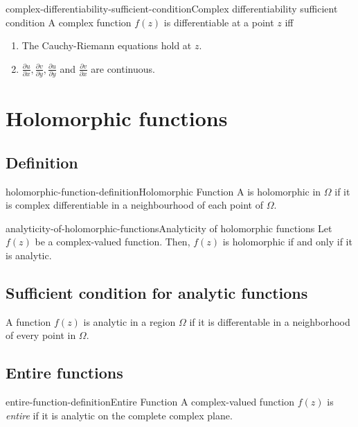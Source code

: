 \documentclass[preview]{standalone}
\begin{document}
\begin{snippettheorem}{complex-differentiability-sufficient-condition}{Complex differentiability sufficient condition}
    A complex function \(f(z)\) is differentiable at a point \(z\)
    iff
    \begin{enumerate}
        \item The Cauchy-Riemann equations hold at \(z\).
        \item \(\frac{\partial u}{\partial x}, \frac{\partial v}{\partial y},
        \frac{\partial u}{\partial y}\) and \(\frac{\partial v}{\partial x}\)
        are continuous.
    \end{enumerate}
\end{snippettheorem}

\section{Holomorphic functions}

\subsection{Definition}

\begin{snippetdefinition}{holomorphic-function-definition}{Holomorphic Function}
    A \function is holomorphic in \(\Omega\) if it is complex differentiable
    in a neighbourhood of each point of \(\Omega\).
\end{snippetdefinition}

\begin{snippettheorem}{analyticity-of-holomorphic-functions}{Analyticity of holomorphic functions}
    Let \(f(z)\) be a complex-valued function.
    Then, \(f(z)\) is holomorphic if and only if it is analytic.
\end{snippettheorem}


\subsection{Sufficient condition for analytic functions}

A function \(f(z)\) is analytic in a region \(\Omega\) if it is differentable
in a neighborhood of every point in \(\Omega\).

\subsection{Entire functions}

\begin{snippetdefinition}{entire-function-definition}{Entire Function}
    A complex-valued function \(f(z)\) is \textit{entire} if it is analytic on the complete complex plane.
\end{snippetdefinition}
\end{document}
